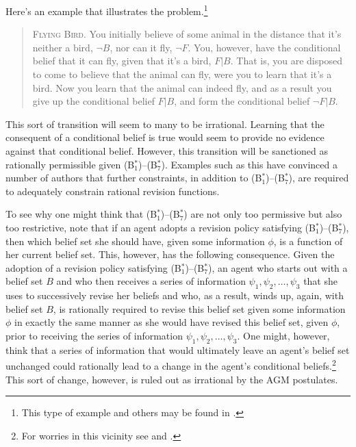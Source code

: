 Here's an example that illustrates the problem.\footnote{This type of example and others may be found in \citet{DarwichePearle}.}


\begin{quote}

\textsc{Flying Bird.} You initially believe of some animal in the distance that it's neither a bird, $\lnot B$, nor can it fly, $\lnot F$.
You, however, have the conditional belief that it can fly, given that it's a bird, $F | B$.
That is, you are disposed to come to believe that the animal can fly, were you to learn that it's a bird.
Now you learn that the animal can indeed fly, and as a result you give up the conditional belief $F | B$, and form the conditional belief $\lnot F | B$.
\end{quote}

This sort of transition will seem to many to be irrational.
Learning that the consequent of a conditional belief is true would seem to provide no evidence against that conditional belief.
However, this transition will be sanctioned as rationally permissible given (B$^*_1$)--(B$^*_7$).
Examples such as this have convinced a number of authors that further constraints, in addition to (B$^*_1$)--(B$^*_7$), are required to adequately constrain rational revision functions. 

To see why one might think that (B$^*_1$)--(B$^*_7$) are not only too permissive but also too restrictive, note that if an agent adopts a revision policy  satisfying (B$^*_1$)--(B$^*_7$), then which belief set she should have, given some information $\phi$, is a function of her current belief set.
This, however, has the following consequence.
Given the adoption of a revision policy satisfying (B$^*_1$)--(B$^*_7$), an agent who starts out with a belief set $B$ and who then receives a series of information $\psi_1, \psi_2,\ldots,\psi_3$ that she uses to successively revise her beliefs and who, as a result, winds up, again, with belief set $B$, is rationally required to revise this belief set given some information $\phi$ in exactly the same manner as she would have revised this belief set, given $\phi$, prior to receiving the series of information $\psi_1, \psi_2,\ldots,\psi_3$.
One might, however, think that a series of information that would ultimately leave an agent's belief set unchanged could rationally lead to a change in the agent's conditional beliefs.\footnote{For worries in this vicinity see \citet{Levi2} and \citet{DarwichePearle}.}
This sort of change, however, is ruled out as irrational by the AGM postulates.



